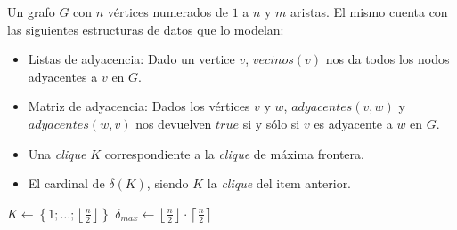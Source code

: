 \begin{pseudocodigo}
    \Require Un grafo $G$ con $n$ v\'ertices numerados de $1$ a $n$ y $m$ aristas. El mismo
        cuenta con las siguientes estructuras de datos que lo modelan:
        \begin{itemize}
            \item Listas de adyacencia: Dado un vertice $v$, $vecinos(v)$ nos da todos los
                nodos adyacentes a $v$ en $G$.

            \item Matriz de adyacencia: Dados los v\'ertices $v$ y $w$, $adyacentes(v,w)$ y
                $adyacentes(w,v)$ nos devuelven $true$ si y s\'olo si $v$ es adyacente
                a $w$ en $G$.
        \end{itemize}
    \Ensure\Statex
        \begin{itemize}
            \item Una \emph{clique} $K$ correspondiente a la \emph{clique} de m\'axima frontera.

            \item El cardinal de $\delta(K)$, siendo $K$ la \emph{clique} del item anterior.
        \end{itemize}

    \Statex
     
        \State $K \gets \left\{1;\dots;\left\lfloor\frac{n}{2}\right\rfloor\right\}$ 
        \Statex
        \State $\delta_{max} \gets \left\lfloor\frac{n}{2}\right\rfloor\cdot
            \left\lceil\frac{n}{2}\right\rceil$ 
        \Statex


\end{pseudocodigo}
